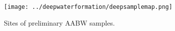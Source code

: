 \begin{figure}
  \centering
  \texttt{[image: ../deepwaterformation/deepsamplemap.png]}
  \caption[Map showing sites of preliminary \ac{AABW} samples]{Sites of preliminary \ac{AABW} samples.}
  \label{fig:deepsamplemap}
\end{figure}
